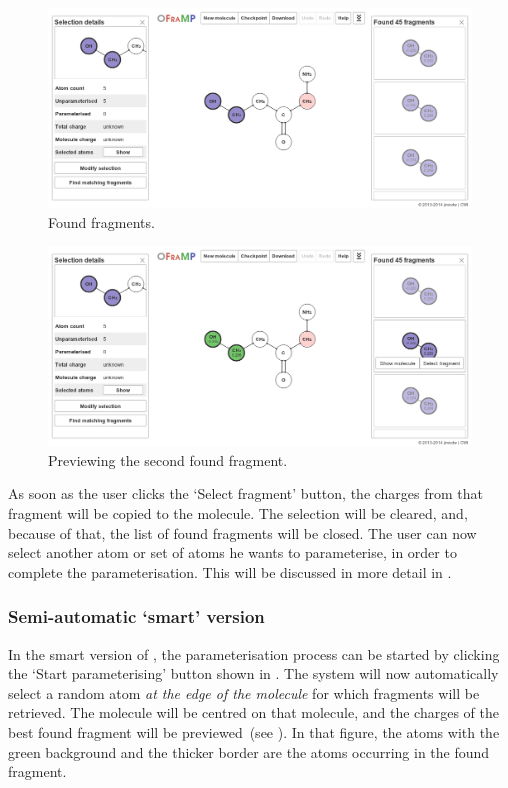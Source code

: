 \begin{figure}
\center
\includegraphics[width=.9\textwidth]{img/find_1.png}
\caption{Found fragments.}
\end{figure}

\begin{figure}
\center
\includegraphics[width=.9\textwidth]{img/find_2.png}
\caption{Previewing the second found fragment.}
\end{figure}

As soon as the user clicks the `Select fragment' button, the charges from that fragment will be copied to the molecule. The selection will be cleared, and, because of that, the list of found fragments will be closed. The user can now select another atom or set of atoms he wants to parameterise, in order to complete the parameterisation. This will be discussed in more detail in .


\subsubsection{Semi-automatic `smart' version}
In the smart version of \oframp, the parameterisation process can be started by clicking the `Start parameterising' button shown in . The system will now automatically select a random atom \emph{at the edge of the molecule} for which fragments will be retrieved. The molecule will be centred on that molecule, and the charges of the best found fragment will be previewed~(see ). In that figure, the atoms with the green background and the thicker border are the atoms occurring in the found fragment.

